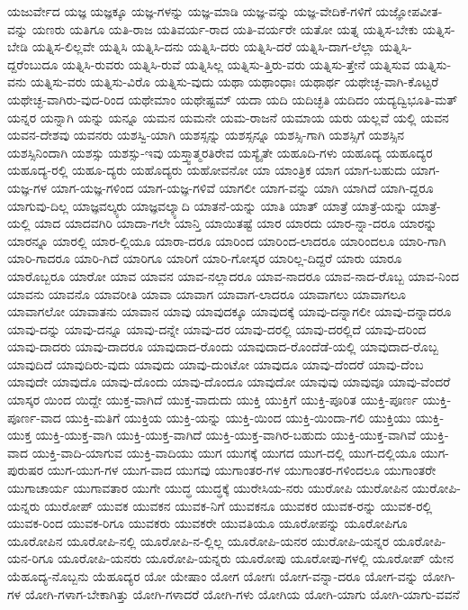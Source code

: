 {ಯಜುರ್ವೇದ
ಯಜ್ಞ
ಯಜ್ಞಕ್ಕೂ
ಯಜ್ಞ-ಗಳನ್ನು
ಯಜ್ಞ-ಮಾಡಿ
ಯಜ್ಞ-ವನ್ನು
ಯಜ್ಞ-ವೇದಿಕೆ-ಗಳಿಗೆ
ಯಜ್ಞೋಪವೀತ-ವನ್ನು
ಯಣರು
ಯತಿಗೂ
ಯತಿ-ರಾಜ
ಯತಿವರ್ಯ-ರಾದ
ಯತಿ-ವರ್ಯರೇ
ಯತೋ
ಯತ್ನ
ಯತ್ನಿಸ-ಬೇಕು
ಯತ್ನಿಸ-ಬೇಡಿ
ಯತ್ನಿಸ-ಲಿಲ್ಲವೇ
ಯತ್ನಿಸಿ
ಯತ್ನಿಸಿ-ದನು
ಯತ್ನಿಸಿ-ದರು
ಯತ್ನಿಸಿ-ದರೆ
ಯತ್ನಿಸಿ-ದಾಗ-ಲೆಲ್ಲಾ
ಯತ್ನಿಸಿ-ದ್ದರೆಂಬುದೂ
ಯತ್ನಿಸಿ-ರುವರು
ಯತ್ನಿಸಿ-ರುವೆ
ಯತ್ನಿಸಿಲ್ಲ
ಯತ್ನಿಸು-ತ್ತಿರು-ವರು
ಯತ್ನಿಸು-ತ್ತೇನೆ
ಯತ್ನಿಸುವ
ಯತ್ನಿಸು-ವನು
ಯತ್ನಿಸು-ವರು
ಯತ್ನಿಸು-ವಿರೊ
ಯತ್ನಿಸು-ವುದು
ಯಥಾ
ಯಥಾಂಧಾಃ
ಯಥಾರ್ಥ
ಯಥೇಚ್ಛ-ವಾಗಿ-ಕೊಟ್ಟರೆ
ಯಥೇಚ್ಛ-ವಾಗಿರು-ವುದ-ರಿಂದ
ಯಥೇಮಾಂ
ಯಥೇಷ್ಟಮ್
ಯದಾ
ಯದಿ
ಯದಿಚ್ಛತಿ
ಯದಿದಂ
ಯದ್ಯದ್ವಿಭೂತಿ-ಮತ್
ಯನ್ನರ
ಯನ್ನಾಗಿ
ಯನ್ನು
ಯನ್ನೂ
ಯಮನ
ಯಮನೇ
ಯಮ-ರಾಜನೆ
ಯಮಾಯ
ಯರು
ಯಲ್ಲವೆ
ಯಲ್ಲಿ
ಯವನ
ಯವನ-ದೇಶವು
ಯವನರು
ಯಶಸ್ವಿ-ಯಾಗಿ
ಯಶಸ್ಸನ್ನು
ಯಶಸ್ಸನ್ನೂ
ಯಶಸ್ಸಿ-ಗಾಗಿ
ಯಶಸ್ಸಿಗೆ
ಯಶಸ್ಸಿನ
ಯಶಸ್ಸಿನಿಂದಾಗಿ
ಯಶಸ್ಸು
ಯಶಸ್ಸು-ಇವು
ಯಸ್ತ್ವಾತ್ಮರತಿರೇವ
ಯಸ್ಯೈತೇ
ಯಹೂದಿ-ಗಳು
ಯಹೂದ್ಯ
ಯಹೂದ್ಯರ
ಯಹೂದ್ಯ-ರಲ್ಲಿ
ಯಹೂ-ದ್ಯರು
ಯಹೊದ್ಯರು
ಯಹೋವನೋ
ಯಾ
ಯಾಂತ್ರಿಕ
ಯಾಗ
ಯಾಗ-ಬಹುದು
ಯಾಗ-ಯಜ್ಞ-ಗಳ
ಯಾಗ-ಯಜ್ಞ-ಗಳಿಂದ
ಯಾಗ-ಯಜ್ಞ-ಗಳಿವೆ
ಯಾಗಲೀ
ಯಾಗ-ವನ್ನು
ಯಾಗಿ
ಯಾಗಿದೆ
ಯಾಗಿ-ದ್ದರೂ
ಯಾಗುವು-ದಿಲ್ಲ
ಯಾಜ್ಞವಲ್ಕ್ಯರು
ಯಾಜ್ಞವಲ್ಕ್ಯಾದಿ
ಯಾತನೆ-ಯನ್ನು
ಯಾತಿ
ಯಾತ್
ಯಾತ್ರೆ
ಯಾತ್ರೆ-ಯನ್ನು
ಯಾತ್ರೆ-ಯಲ್ಲಿ
ಯಾದ
ಯಾದವಗಿರಿ
ಯಾದಾ-ಗಲೇ
ಯಾನ್ತಿ
ಯಾಯಿತಷ್ಟೆ
ಯಾರ
ಯಾರದು
ಯಾರ-ನ್ನಾ-ದರೂ
ಯಾರನ್ನು
ಯಾರನ್ನೂ
ಯಾರಲ್ಲಿ
ಯಾರ-ಲ್ಲಿಯೂ
ಯಾರಾ-ದರೂ
ಯಾರಿಂದ
ಯಾರಿಂದ-ಲಾದರೂ
ಯಾರಿಂದಲೂ
ಯಾರಿ-ಗಾಗಿ
ಯಾರಿ-ಗಾದರೂ
ಯಾರಿ-ಗಿದೆ
ಯಾರಿಗೂ
ಯಾರಿಗೆ
ಯಾರಿ-ಗೋಸ್ಕರ
ಯಾರಿಲ್ಲ-ದಿದ್ದರೆ
ಯಾರು
ಯಾರೂ
ಯಾರೊಬ್ಬರೂ
ಯಾರೋ
ಯಾವ
ಯಾವನ
ಯಾವ-ನಲ್ಲಾದರೂ
ಯಾವ-ನಾದರೂ
ಯಾವ-ನಾದ-ರೊಬ್ಬ
ಯಾವ-ನಿಂದ
ಯಾವನು
ಯಾವನೊ
ಯಾವರೀತಿ
ಯಾವಾ
ಯಾವಾಗ
ಯಾವಾಗ-ಲಾದರೂ
ಯಾವಾಗಲು
ಯಾವಾಗಲೂ
ಯಾವಾಗಲೋ
ಯಾವಾತನು
ಯಾವಾನ
ಯಾವು
ಯಾವುದಕ್ಕೂ
ಯಾವುದಕ್ಕೆ
ಯಾವು-ದನ್ನಾಗಲೀ
ಯಾವು-ದನ್ನಾದರೂ
ಯಾವು-ದನ್ನು
ಯಾವು-ದನ್ನೂ
ಯಾವು-ದನ್ನೇ
ಯಾವು-ದರ
ಯಾವು-ದರಲ್ಲಿ
ಯಾವು-ದರಲ್ಲಿದೆ
ಯಾವು-ದರಿಂದ
ಯಾವು-ದಾದರು
ಯಾವು-ದಾದರೂ
ಯಾವುದಾದ-ರೊಂದು
ಯಾವುದಾದ-ರೊಂದೆಡೆ-ಯಲ್ಲಿ
ಯಾವುದಾದ-ರೊಬ್ಬ
ಯಾವುದಿದೆ
ಯಾವುದಿರು-ವುದು
ಯಾವುದು
ಯಾವು-ದುಂಟೋ
ಯಾವುದೂ
ಯಾವು-ದೆಂದರೆ
ಯಾವು-ದೆಂಬ
ಯಾವುದೇ
ಯಾವುದೊ
ಯಾವು-ದೊಂದು
ಯಾವು-ದೊಂದೂ
ಯಾವುದೋ
ಯಾವುವು
ಯಾವುವೂ
ಯಾವು-ವೆಂದರೆ
ಯಾಸ್ಕರ
ಯಿಂದ
ಯಿದ್ದೇ
ಯುಕ್ತ-ವಾಗಿದೆ
ಯುಕ್ತ-ವಾದುದು
ಯುಕ್ತಿ
ಯುಕ್ತಿಗೆ
ಯುಕ್ತಿ-ಪೂರಿತ
ಯುಕ್ತಿ-ಪೂರ್ಣ
ಯುಕ್ತಿ-ಪೂರ್ಣ-ವಾದ
ಯುಕ್ತಿ-ಮತಿಗೆ
ಯುಕ್ತಿಯ
ಯುಕ್ತಿ-ಯನ್ನು
ಯುಕ್ತಿ-ಯಿಂದ
ಯುಕ್ತಿ-ಯಿಂದಾ-ಗಲಿ
ಯುಕ್ತಿಯು
ಯುಕ್ತಿ-ಯುಕ್ತ
ಯುಕ್ತಿ-ಯುಕ್ತ-ವಾಗಿ
ಯುಕ್ತಿ-ಯುಕ್ತ-ವಾಗಿದೆ
ಯುಕ್ತಿ-ಯುಕ್ತ-ವಾಗಿರ-ಬಹುದು
ಯುಕ್ತಿ-ಯುಕ್ತ-ವಾಗಿವೆ
ಯುಕ್ತಿ-ವಾದ
ಯುಕ್ತಿ-ವಾದಿ-ಯಾಗುವ
ಯುಕ್ತಿ-ವಾದಿಯು
ಯುಗ
ಯುಗಕ್ಕೆ
ಯುಗದ
ಯುಗ-ದಲ್ಲಿ
ಯುಗ-ದಲ್ಲಿಯೂ
ಯುಗ-ಪುರುಷರ
ಯುಗ-ಯುಗ-ಗಳ
ಯುಗ-ವಾದ
ಯುಗವು
ಯುಗಾಂತರ-ಗಳ
ಯುಗಾಂತರ-ಗಳಿಂದಲೂ
ಯುಗಾಂತರೇ
ಯುಗಾಚಾರ್ಯ
ಯುಗಾವತಾರ
ಯುಗೇ
ಯುದ್ಧ
ಯುದ್ಧಕ್ಕೆ
ಯುರೇಸಿಯ-ನರು
ಯುರೋಪಿ
ಯುರೋಪಿನ
ಯುರೋಪಿ-ಯನ್ನರು
ಯುರೋಪ್
ಯುವಕ
ಯುವಕನ
ಯುವಕ-ನಿಗೆ
ಯುವಕನೂ
ಯುವಕರ
ಯುವಕ-ರನ್ನು
ಯುವಕ-ರಲ್ಲಿ
ಯುವಕ-ರಿಂದ
ಯುವಕ-ರಿಗೂ
ಯುವಕರು
ಯುವಕರೇ
ಯುವತಿಯೂ
ಯೂರೋಪನ್ನು
ಯೂರೋಪಿಗೂ
ಯೂರೋಪಿನ
ಯೂರೋಪಿ-ನಲ್ಲಿ
ಯೂರೋಪಿ-ನ-ಲ್ಲಿಲ್ಲ
ಯೂರೋಪಿ-ಯನರ
ಯುರೋಪಿ-ಯನ್ನರ
ಯೂರೋಪಿ-ಯನ-ರಿಗೂ
ಯೂರೋಪಿ-ಯನರು
ಯೂರೋಪಿ-ಯನ್ನರು
ಯೂರೋಪು
ಯೂರೋಪು-ಗಳಲ್ಲಿ
ಯೂರೋಪ್
ಯೇನ
ಯೆಹೂದ್ಯ-ನೊಬ್ಬನು
ಯೆಹೂದ್ಯರ
ಯೋ
ಯೇಷಾಂ
ಯೋಗ
ಯೋಗಃ
ಯೋಗ-ವನ್ನಾ-ದರೂ
ಯೋಗ-ವನ್ನು
ಯೋಗಿ-ಗಳ
ಯೋಗಿ-ಗಳಾಗ-ಬೇಕಾಗಿತ್ತು
ಯೋಗಿ-ಗಳಾದರೆ
ಯೋಗಿ-ಗಳು
ಯೋಗಿಯ
ಯೋಗಿ-ಯಾಗು
ಯೋಗಿ-ಯಾಗು-ವವನೆ
}
